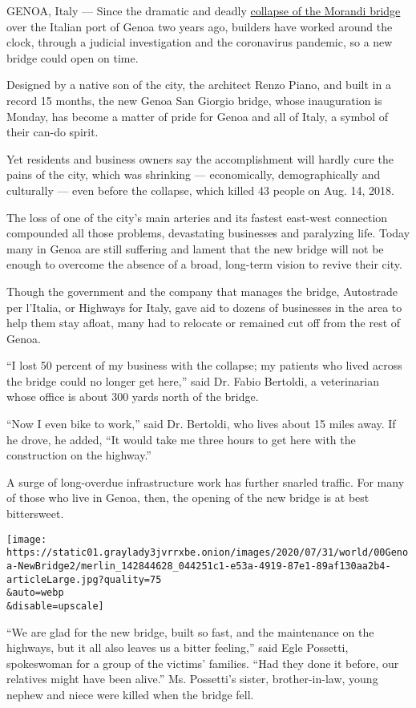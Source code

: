 GENOA, Italy --- Since the dramatic and deadly
\href{https://www.nytimes3xbfgragh.onion/2018/08/14/world/europe/italy-genoa-bridge-collapse.html}{collapse
of the Morandi bridge} over the Italian port of Genoa two years ago,
builders have worked around the clock, through a judicial investigation
and the coronavirus pandemic, so a new bridge could open on time.

Designed by a native son of the city, the architect Renzo Piano, and
built in a record 15 months, the new Genoa San Giorgio bridge, whose
inauguration is Monday, has become a matter of pride for Genoa and all
of Italy, a symbol of their can-do spirit.

Yet residents and business owners say the accomplishment will hardly
cure the pains of the city, which was shrinking --- economically,
demographically and culturally --- even before the collapse, which
killed 43 people on Aug. 14, 2018.

The loss of one of the city's main arteries and its fastest east-west
connection compounded all those problems, devastating businesses and
paralyzing life. Today many in Genoa are still suffering and lament that
the new bridge will not be enough to overcome the absence of a broad,
long-term vision to revive their city.

Though the government and the company that manages the bridge,
Autostrade per l'Italia, or Highways for Italy, gave aid to dozens of
businesses in the area to help them stay afloat, many had to relocate or
remained cut off from the rest of Genoa.

``I lost 50 percent of my business with the collapse; my patients who
lived across the bridge could no longer get here,'' said Dr. Fabio
Bertoldi, a veterinarian whose office is about 300 yards north of the
bridge.

``Now I even bike to work,'' said Dr. Bertoldi, who lives about 15 miles
away. If he drove, he added, ``It would take me three hours to get here
with the construction on the highway.''

A surge of long-overdue infrastructure work has further snarled traffic.
For many of those who live in Genoa, then, the opening of the new bridge
is at best bittersweet.

\texttt{[image: https://static01.graylady3jvrrxbe.onion/images/2020/07/31/world/00Genoa-NewBridge2/merlin\_142844628\_044251c1-e53a-4919-87e1-89af130aa2b4-articleLarge.jpg?quality=75\\\&auto=webp\\\&disable=upscale]}

``We are glad for the new bridge, built so fast, and the maintenance on
the highways, but it all also leaves us a bitter feeling,'' said Egle
Possetti, spokeswoman for a group of the victims' families. ``Had they
done it before, our relatives might have been alive.'' Ms. Possetti's
sister, brother-in-law, young nephew and niece were killed when the
bridge fell.

